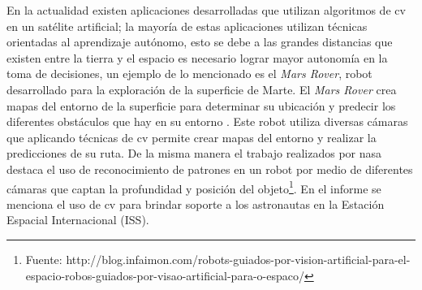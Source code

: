 En la actualidad existen aplicaciones desarrolladas que utilizan algoritmos de \ac{cv} en un satélite artificial; la mayoría de estas aplicaciones utilizan técnicas orientadas al aprendizaje autónomo, esto se debe a las grandes distancias que existen entre la tierra y el espacio  es necesario lograr mayor autonomía en la toma de decisiones, un ejemplo de lo mencionado es el \textit{Mars Rover}, robot desarrollado para la exploración de la superficie de Marte. El \textit{Mars Rover} crea mapas del entorno de la superficie para determinar su ubicación y predecir los diferentes obstáculos que hay en su entorno \citep{RoverMars}. Este robot utiliza  diversas cámaras que aplicando técnicas de \ac{cv}  permite crear mapas del entorno y realizar la predicciones de su ruta. De la misma manera el trabajo realizados  por \ac{nasa}  destaca el uso de reconocimiento de patrones en un robot por medio de diferentes cámaras que captan la profundidad y posición del objeto\footnote{Fuente: 
http://blog.infaimon.com/robots-guiados-por-vision-artificial-para-el-espacio-robos-guiados-por-visao-artificial-para-o-espaco/}. En el informe se menciona el uso de \ac{cv} para brindar soporte a los astronautas en la Estación Espacial Internacional (ISS). 

